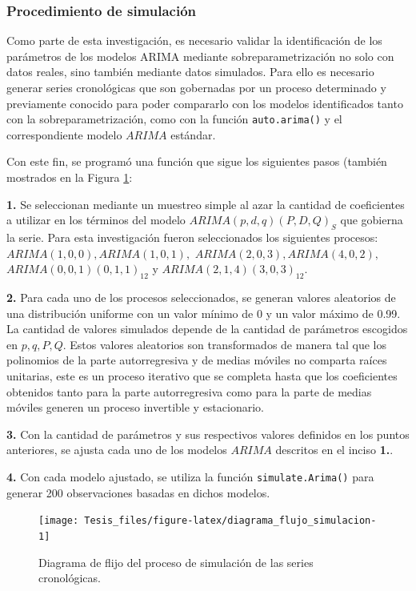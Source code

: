 \documentclass[
]{article}
\begin{document}
\subsubsection{Procedimiento de simulación}

Como parte de esta investigación, es necesario validar la identificación
de los parámetros de los modelos ARIMA mediante sobreparametrización no
solo con datos reales, sino también mediante datos simulados. Para ello
es necesario generar series cronológicas que son gobernadas por un
proceso determinado y previamente conocido para poder compararlo con los
modelos identificados tanto con la sobreparametrización, como con la
función \texttt{auto.arima()} y el correspondiente modelo \(ARIMA\)
estándar.

Con este fin, se programó una función que sigue los siguientes pasos
(también mostrados en la Figura \ref{fig:diagrama_flujo_simulacion}:

\textbf{1.} Se seleccionan mediante un muestreo simple al azar la
cantidad de coeficientes a utilizar en los términos del modelo
\(ARIMA(p,d,q)(P,D,Q)_S\) que gobierna la serie. Para esta investigación
fueron seleccionados los siguientes procesos:
\(ARIMA(1,0,0), ARIMA(1,0,1),\) \(ARIMA(2,0,3), ARIMA(4,0,2),\)
\(ARIMA(0,0,1)(0,1,1)_{12}\) y \(ARIMA(2,1,4)(3,0,3)_{12}\).

\textbf{2.} Para cada uno de los procesos seleccionados, se generan
valores aleatorios de una distribución uniforme con un valor mínimo de 0
y un valor máximo de 0.99. La cantidad de valores simulados depende de
la cantidad de parámetros escogidos en \(p, q, P, Q\). Estos valores
aleatorios son transformados de manera tal que los polinomios de la
parte autorregresiva y de medias móviles no comparta raíces unitarias,
este es un proceso iterativo que se completa hasta que los coeficientes
obtenidos tanto para la parte autorregresiva como para la parte de
medias móviles generen un proceso invertible y estacionario.

\textbf{3.} Con la cantidad de parámetros y sus respectivos valores
definidos en los puntos anteriores, se ajusta cada uno de los modelos
\(ARIMA\) descritos en el inciso \textbf{1.}.

\textbf{4.} Con cada modelo ajustado, se utiliza la función
\texttt{simulate.Arima()} para generar 200 observaciones basadas en
dichos modelos.

\begin{figure}[H]
\texttt{[image: Tesis\_files/figure-latex/diagrama\_flujo\_simulacion-1]} \caption{Diagrama de flijo del proceso de simulación de las series cronológicas.}\label{fig:diagrama_flujo_simulacion}
\end{figure}
\end{document}
